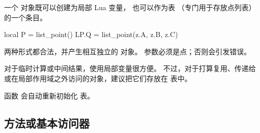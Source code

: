\medskip

一个  对象既可以创建为局部 Lua 变量，
也可以作为表 （专门用于存放点列表）的一个条目。

\begin{tkzexample}
local P = list_point()
LP.Q = list_point(z.A, z.B, z.C)
\end{tkzexample}

两种形式都合法，并产生相互独立的  对象。
参数必须是点；否则会引发错误。

\medskip

对于临时计算或中间结果，使用局部变量很方便。
不过，对于打算复用、传递给  或在局部作用域之外访问的对象，建议把它们存放在  表中。

\medskip

函数  会自动重新初始化
 表。


\subsection{方法或基本访问器}
\label{subsec:list_point_accessors}

